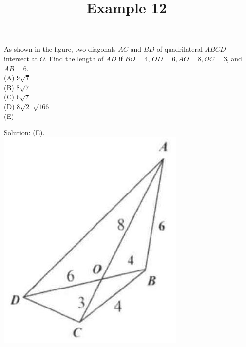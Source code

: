 \documentclass{article}
\title{Example 12}
\date{}
\begin{document}
\maketitle

As shown in the figure, two diagonals \(A C\) and \(B D\) of quadrilateral \(A B C D\) intersect at \(O\). Find the length of \(A D\) if \(B O=4\), \(O D=6, A O=8, O C=3\), and \(A B=6\).\\
(A) \(9 \sqrt{7}\)\\
(B) \(8 \sqrt{7}\)\\
(C) \(6 \sqrt{7}\)\\
(D) \(8 \sqrt{2}\) \(\sqrt{166}\)\\
(E)

Solution: (E).\\
\centering
\includegraphics[width=\textwidth]{images/problem_image_1.jpg}
\end{document}
